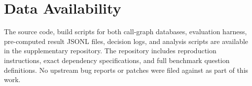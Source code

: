 \section{Data Availability}
\label{sec:data}

The source code, build scripts for both call-graph databases, evaluation harness,
pre-computed result JSONL files, decision logs, and analysis scripts are available in the
supplementary repository.
The repository includes reproduction instructions, exact dependency specifications,
and full benchmark question definitions.
No upstream bug reports or patches were filed against \sqlite{} as part of this work.
